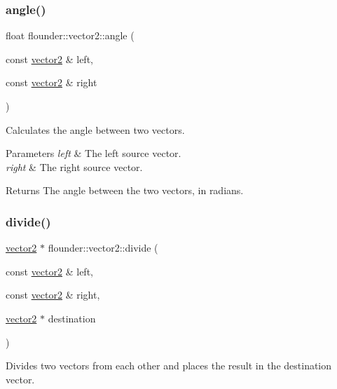\subsubsection{\texorpdfstring{angle()}{angle()}}
{\footnotesize\ttfamily float flounder\+::vector2\+::angle (\begin{DoxyParamCaption}\item[{const \hyperlink{classflounder_1_1vector2}{vector2} \&}]{left,  }\item[{const \hyperlink{classflounder_1_1vector2}{vector2} \&}]{right }\end{DoxyParamCaption})\hspace{0.3cm}{\ttfamily [static]}}



Calculates the angle between two vectors. 


\begin{DoxyParams}{Parameters}
{\em left} & The left source vector. \\
\hline
{\em right} & The right source vector. \\
\hline
\end{DoxyParams}
\begin{DoxyReturn}{Returns}
The angle between the two vectors, in radians. 
\end{DoxyReturn}
\mbox{\label{classflounder_1_1vector2_a6fd7416726d39deaba2abacd9b094984}} 
\subsubsection{\texorpdfstring{divide()}{divide()}}
{\footnotesize\ttfamily \hyperlink{classflounder_1_1vector2}{vector2} $\ast$ flounder\+::vector2\+::divide (\begin{DoxyParamCaption}\item[{const \hyperlink{classflounder_1_1vector2}{vector2} \&}]{left,  }\item[{const \hyperlink{classflounder_1_1vector2}{vector2} \&}]{right,  }\item[{\hyperlink{classflounder_1_1vector2}{vector2} $\ast$}]{destination }\end{DoxyParamCaption})\hspace{0.3cm}{\ttfamily [static]}}



Divides two vectors from each other and places the result in the destination vector. 


